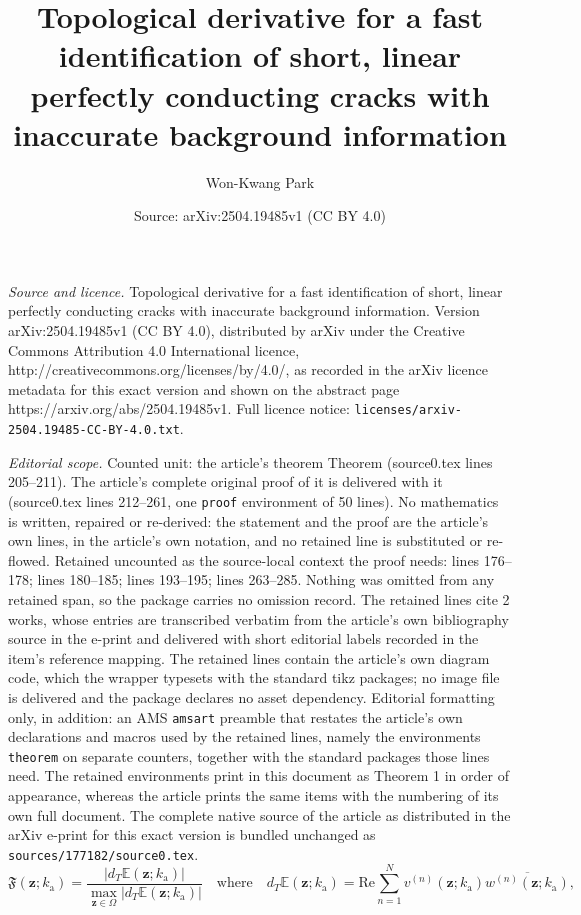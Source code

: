 \documentclass[10pt,a4paper]{amsart}
\title{Topological derivative for a fast identification of short, linear perfectly conducting cracks with inaccurate background information}
\author{Won-Kwang Park}
\date{Source: arXiv:2504.19485v1 (CC BY 4.0)}
\newcommand{\ka}{k_{\mathrm{a}}}
\newcommand{\mz}{\mathbf{z}}
\begin{document}
\maketitle

\noindent\emph{Source and licence.} Topological derivative for a fast identification of short, linear perfectly conducting cracks with inaccurate background information. Version arXiv:2504.19485v1 (CC BY 4.0), distributed by arXiv under the Creative Commons Attribution 4.0 International licence, http://creativecommons.org/licenses/by/4.0/, as recorded in the arXiv licence metadata for this exact version and shown on the abstract page https://arxiv.org/abs/2504.19485v1. Full licence notice: \texttt{licenses/arxiv-2504.19485-CC-BY-4.0.txt}.\par\smallskip

\noindent\textit{Editorial scope.} Counted unit: the article's theorem Theorem (source0.tex lines 205--211). The article's complete original proof of it is delivered with it (source0.tex lines 212--261, one \texttt{proof} environment of 50 lines). No mathematics is written, repaired or re-derived: the statement and the proof are the article's own lines, in the article's own notation, and no retained line is substituted or re-flowed.  Retained uncounted as the source-local context the proof needs: lines 176--178; lines 180--185; lines 193--195; lines 263--285.  Nothing was omitted from any retained span, so the package carries no omission record.  The retained lines cite 2 works, whose entries are transcribed verbatim from the article's own bibliography source in the e-print and delivered with short editorial labels recorded in the item's reference mapping.  The retained lines contain the article's own diagram code, which the wrapper typesets with the standard tikz packages; no image file is delivered and the package declares no asset dependency.  Editorial formatting only, in addition: an AMS \texttt{amsart} preamble that restates the article's own declarations and macros used by the retained lines, namely the environments \texttt{theorem} on separate counters, together with the standard packages those lines need.  The retained environments print in this document as Theorem 1 in order of appearance, whereas the article prints the same items with the numbering of its own full document.  The complete native source of the article as distributed in the arXiv e-print for this exact version is bundled unchanged as \texttt{sources/177182/source0.tex}.
\begin{equation}\label{NormalizedTopologicalDerivative}
  \mathfrak{F}(\mz;\ka)=\frac{|d_T\mathbb{E}(\mz;\ka)|}{\displaystyle\max_{\mz\in\Omega}|d_T\mathbb{E}(\mz;\ka)|}\quad\text{where}\quad d_T\mathbb{E}(\mz;\ka)=\mathrm{Re}\sum_{n=1}^{N}v^{(n)}(\mz;\ka)\overline{w^{(n)}(\mz;\ka)},
\end{equation}
\end{document}
